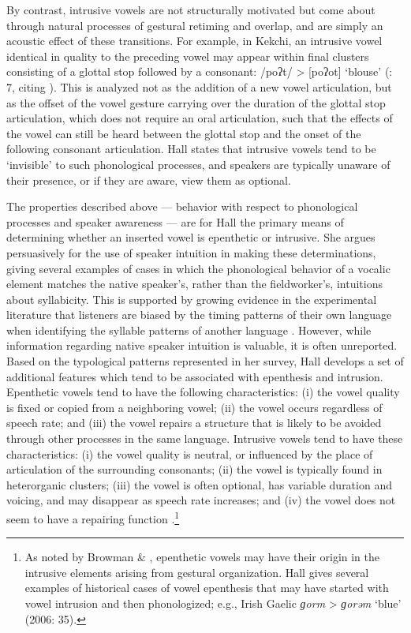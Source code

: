   By contrast, intrusive vowels are not structurally motivated but come about through natural processes of gestural retiming and overlap, and are simply an acoustic effect of these transitions. For example, in Kekchi, an intrusive vowel identical in quality to the preceding vowel may appear within final clusters consisting of a glottal stop followed by a consonant: /poʔt/ > [poʔot] ‘blouse’ (\citealt{Hall2006}: 7, citing \citealt{Campbell1974}). This is analyzed not as the addition of a new vowel articulation, but as the offset of the vowel gesture carrying over the duration of the glottal stop articulation, which does not require an oral articulation, such that the effects of the vowel can still be heard between the glottal stop and the onset of the following consonant articulation. Hall states that intrusive vowels tend to be ‘invisible’ to such phonological processes, and speakers are typically unaware of their presence, or if they are aware, view them as optional.

  The properties described above — behavior with respect to phonological processes and speaker awareness — are for Hall the primary means of determining whether an inserted vowel is epenthetic or intrusive. She argues persuasively for the use of speaker intuition in making these determinations, giving several examples of cases in which the phonological behavior of a vocalic element matches the native speaker’s, rather than the fieldworker’s, intuitions about syllabicity. This is supported by growing evidence in the experimental literature that listeners are biased by the timing patterns of their own language when identifying the syllable patterns of another language \citep{KwonEtAl2017}. However, while information regarding native speaker intuition is valuable, it is often unreported. Based on the typological patterns represented in her survey, Hall develops a set of additional features which tend to be associated with epenthesis and intrusion. Epenthetic vowels tend to have the following characteristics: (i) the vowel quality is fixed or copied from a neighboring vowel; (ii) the vowel occurs regardless of speech rate; and (iii) the vowel repairs a structure that is likely to be avoided through other processes in the same language. Intrusive vowels tend to have these characteristics: (i) the vowel quality is neutral, or influenced by the place of articulation of the surrounding consonants; (ii) the vowel is typically found in heterorganic clusters; (iii) the vowel is often optional, has variable duration and voicing, and may disappear as speech rate increases; and (iv) the vowel does not seem to have a repairing function \citep[391]{Hall2006}.\footnote{ \textrm{As noted by Browman \& \citet[53]{Goldstein1992a}, epenthetic vowels may have their origin in the intrusive elements arising from gestural organization. Hall gives several examples of historical cases of vowel epenthesis that may have started with vowel intrusion and then phonologized; e.g., Irish Gaelic} \textrm{\textit{ɡorm}} > \textrm{\textit{ɡorəm}} \textrm{‘blue’ (2006: 35).}}

